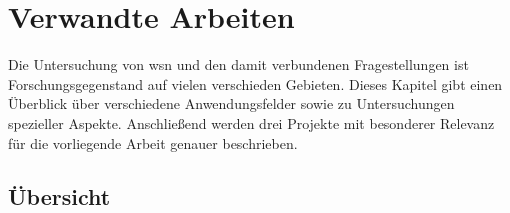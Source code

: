 \chapter{Verwandte Arbeiten}\label{kap:verwandtearbeiten}

Die Untersuchung von \ac{wsn} und den damit verbundenen Fragestellungen ist Forschungsgegenstand auf vielen verschieden Gebieten. Dieses Kapitel gibt einen Überblick über verschiedene Anwendungsfelder sowie zu Untersuchungen spezieller Aspekte. Anschließend werden drei Projekte mit besonderer Relevanz für die vorliegende Arbeit genauer beschrieben.

\section{Übersicht}


